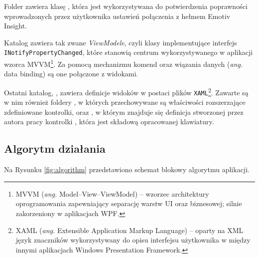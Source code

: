 \documentclass[skorowidz,skroty]{dyplomWEZUT}
\begin{document}
Folder  zawiera klasę , która jest wykorzystywana do potwierdzenia poprawności wprowadzonych przez użytkownika ustawień połączenia z hełmem Emotiv Insight.

Katalog  zawiera tak zwane \textit{ViewModele}, czyli klasy implementujące interfejs \lstinline[language={[Sharp]C}]{INotifyPropertyChanged}, które stanowią centrum wykorzystywanego w aplikacji wzorca MVVM\footnote{MVVM (\textit{ang.} Model--View--ViewModel) -- wzorzec architektury oprogramowania zapewniający separację warstw UI oraz biznesowej; silnie zakorzeniony w aplikacjach WPF.}. Za pomocą mechanizmu komend oraz wiązania danych (\textit{ang.} data binding) są one połączone z widokami.

Ostatni katalog, , zawiera definicje widoków w postaci plików \lstinline[language={[Sharp]C}]{XAML}\footnote{XAML (\textit{ang.} Extensible Application Markup Language) -- oparty na XML język znaczników wykorzystywany do opisu interfejsu użytkownika w między innymi aplikacjach Windows Presentation Framework.}. Zawarte są w nim również foldery , w których przechowywane są właściwości rozszerzające zdefiniowane kontrolki, oraz , w którym znajduje się definicja stworzonej przez autora pracy kontrolki , która jest składową opracowanej klawiatury.  


\subsection{Algorytm działania}
Na Rysunku \vref{fig:algorithm} przedstawiono schemat blokowy algorytmu aplikacji.
\end{document}
